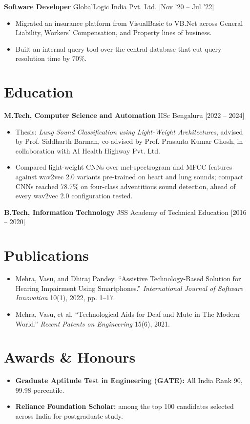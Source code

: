 \documentclass[a4paper,10pt]{article}
\newcommand{\role}[3]{\noindent\textbf{#1} \textbar{} #2 \hfill [#3]\par}
\begin{document}
\role{Software Developer}{GlobalLogic India Pvt. Ltd.}{Nov '20 -- Jul '22}
\begin{itemize}
  \item Migrated an insurance platform from VisualBasic to VB.Net across General Liability, Workers' Compensation, and Property lines of business.
  \item Built an internal query tool over the central database that cut query resolution time by 70\%.
\end{itemize}

\section{Education}

\role{M.Tech, Computer Science and Automation}{IISc Bengaluru}{2022 -- 2024}
\begin{itemize}
  \item Thesis: \textit{Lung Sound Classification using Light-Weight Architectures}, advised by Prof. Siddharth Barman, co-advised by Prof. Prasanta Kumar Ghosh, in collaboration with AI Health Highway Pvt. Ltd.
  \item Compared light-weight CNNs over mel-spectrogram and MFCC features against wav2vec 2.0 variants pre-trained on heart and lung sounds; compact CNNs reached 78.7\% on four-class adventitious sound detection, ahead of every wav2vec 2.0 configuration tested.
\end{itemize}

\role{B.Tech, Information Technology}{JSS Academy of Technical Education}{2016 -- 2020}

\section{Publications}
\begin{itemize}
  \item Mehra, Vasu, and Dhiraj Pandey. ``Assistive Technology-Based Solution for Hearing Impairment Using Smartphones.'' \textit{International Journal of Software Innovation} 10(1), 2022, pp. 1--17.
  \item Mehra, Vasu, et al. ``Technological Aids for Deaf and Mute in The Modern World.'' \textit{Recent Patents on Engineering} 15(6), 2021.
\end{itemize}

\section{Awards \& Honours}
\begin{itemize}
  \item \textbf{Graduate Aptitude Test in Engineering (GATE):} All India Rank 90, 99.98 percentile.
  \item \textbf{Reliance Foundation Scholar:} among the top 100 candidates selected across India for postgraduate study.
\end{itemize}
\end{document}
